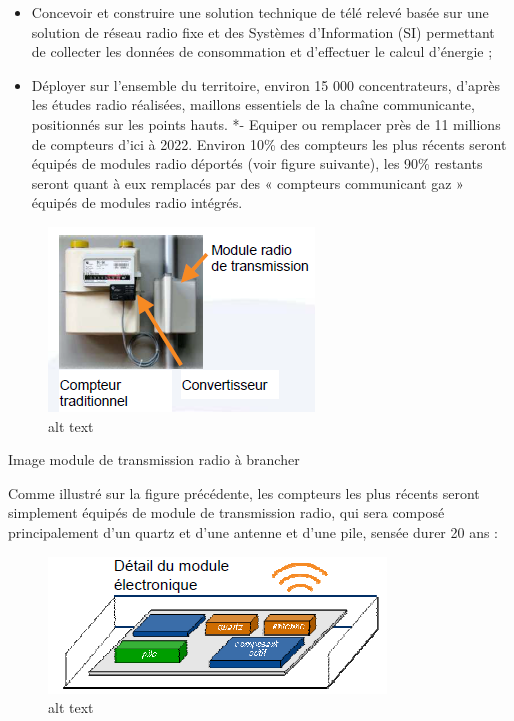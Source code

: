 \documentclass[
12pt,
french,                           %
a4paper,
]{article}
\begin{document}
\begin{itemize}
\item
  Concevoir et construire une solution technique de télé relevé basée
  sur une solution de réseau radio fixe et des Systèmes d'Information
  (SI) permettant de collecter les données de consommation et
  d'effectuer le calcul d'énergie ;
\item
  Déployer sur l'ensemble du territoire, environ 15 000 concentrateurs,
  d'après les études radio réalisées, maillons essentiels de la chaîne
  communicante, positionnés sur les points hauts. *- Equiper ou
  remplacer près de 11 millions de compteurs d'ici à 2022. Environ 10\%
  des compteurs les plus récents seront équipés de modules radio
  déportés (voir figure suivante), les 90\% restants seront quant à eux
  remplacés par des « compteurs communicant gaz » équipés de modules
  radio intégrés.
\end{itemize}

\begin{figure}[htbp]
\centering
\includegraphics{module.png}
\caption{alt text}
\end{figure}

Image module de transmission radio à brancher

Comme illustré sur la figure précédente, les compteurs les plus récents
seront simplement équipés de module de transmission radio, qui sera
composé principalement d'un quartz et d'une antenne et d'une pile,
sensée durer 20 ans :

\begin{figure}[htbp]
\centering
\includegraphics{detailmodule.png}
\caption{alt text}
\end{figure}
\end{document}
